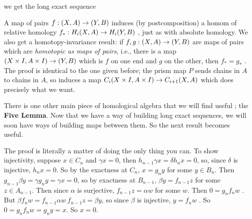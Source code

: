 \ssk

we get the long exact sequence 

\ssk


\msk

A map of pairs $f: (X,A) \rightarrow (Y,B)$
induces (by postcomposition) a homom of relative homology $f_*:H_i(X,A)\rightarrow H_i(Y,B)$ , just as with 
absolute homology.
We also get a homotopy-invariance result: if $f,g: (X,A) \rightarrow (Y,B)$ are maps of pairs
which are {\it homotopic as maps of pairs},
i.e., there is a map $(X\times I,A\times I)\rightarrow (Y,B)$ which is $f$ on one end and $g$ on the other, 
then $f_*=g_*$ . The proof is identical to the one given before; the prism map 
$P$ sends chains in $A$ to chains in $A$, so induces a map $C_i(X\times I,A\times I)\rightarrow C_{i+1}(X,A)$
which does precisely what we want.

\vfill
\eject

There is one other main piece of homological algebra
that we will find useful ; the {\bf Five Lemma}. Now that we have a way of building long exact sequences, we 
will soon have ways of building maps between them. So the next result becomes useful.

\msk


\ssk


\ssk


\msk

The proof is literally a matter of doing the only thing you can. To show injectivity, suppose
$x\in C_n$ and $\gamma x = 0$, 
then $h_{n-1}\gamma x = \delta h_n x = 0$, so, 
since $\delta$ is injective,
$h_n x = 0$. So 
by the exactness at $C_n$, $x=g_n y$ for some $y\in B_n$. 
Then $g_{n-1} \beta y = \gamma g_n y = \gamma x = 0$, so 
by exactness at $B_{n-1}$, $\beta y = f_{n-1} z$ for some $z\in A_{n-1}$. Then 
since $\alpha$ is surjective,
$f_{n-1}z = \alpha w$ for some $w$. Then 
$0=g_n f_n w$ . But 
$\beta f_n w = f_{n-1} \alpha w \ f_{n-1} z = \beta y$, so since
$\beta$ is injective, 
$y= f_n w$ . So $0=g_n f_n w = g_n y = x$. So $x=0$.

